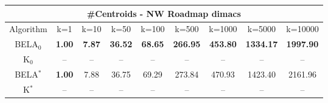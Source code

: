 \begin{tabular}{c|cccccccc}\toprule
\multicolumn{9}{c}{#Centroids - NW Roadmap dimacs}\\ \midrule
Algorithm & k=1 & k=10 & k=50 & k=100 & k=500 & k=1000 & k=5000 & k=10000 \\ \midrule
BELA$_0$ & \textbf{1.00} & \textbf{7.87} & \textbf{36.52} & \textbf{68.65} & \textbf{266.95} & \textbf{453.80} & \textbf{1334.17} & \textbf{1997.90} \\
K$_0$ & -- & -- & -- & -- & -- & -- & -- & -- \\
BELA$^*$ & \textbf{1.00} & 7.88 & 36.75 & 69.29 & 273.84 & 470.93 & 1423.40 & 2161.96 \\
K$^*$ & -- & -- & -- & -- & -- & -- & -- & -- \\ \bottomrule 
\end{tabular}
